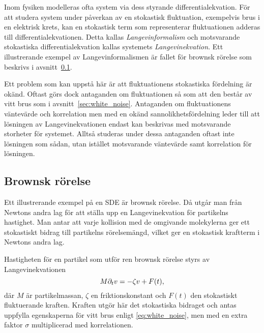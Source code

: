 Inom fysiken modelleras ofta system via dess styrande differentialekvation. För att studera system under påverkan av en stokastisk fluktuation, exempelvis brus i en elektrisk krets, kan en stokastisk term som representerar fluktuationen adderas till differentialekvationen. Detta kallas \emph{Langevinformalism} och motsvarande stokastiska differentialekvation kallas systemets \emph{Langevinekvation}. Ett illustrerande exempel av Langevinformalismen är fallet för brownsk rörelse som beskrivs i avsnitt~\ref{sec:brown}.

Ett problem som kan uppstå här är att fluktuationens stokastiska fördelning är okänd. Oftast görs dock antaganden om fluktuationen så som att den består av vitt brus som i avsnitt~\ref{sec:white_noise}. 
Antaganden om fluktuationens väntevärde och korrelation men med en okänd sannolikhetsfördelning leder till att lösningen av Langevinekvationen endast kan beskrivas med motsvarande storheter för systemet. Alltså studeras under dessa antaganden oftast inte lösningen som sådan, utan istället motsvarande väntevärde samt korrelation för lösningen.  






\subsection{Brownsk rörelse}\label{sec:brown}
Ett illustrerande exempel på en SDE är brownsk rörelse. Då utgår man från Newtons andra lag för att ställa upp en Langevinekvation för partikelns hastighet. Man antar att varje kollision med de omgivande molekylerna ger ett stokastiskt bidrag till partikelns rörelsemängd, vilket ger en stokastisk kraftterm i Newtons andra lag.

Hastigheten för en partikel som utför ren brownsk rörelse styrs av
Langevinekvationen~\cite{Mazo_Brownian2002} 
\begin{equation} \label{eq:Brownian_SDE}
    M\partial_tv=-\zeta v + F(t),
\end{equation}
där $M$ är partikelmassan, $\zeta$ en friktionskonstant och $F(t)$ den stokastiskt fluktuerande kraften. Kraften utgör här det stokastiska bidraget och antas uppfylla egenskaperna för vitt brus enligt \eqref{eq:white_noise}, men med en extra faktor $\sigma$ multiplicerad med korrelationen.


